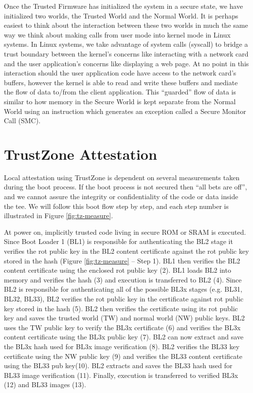 Once the Trusted Firmware has initialized the system in a secure state, we have initialized two worlds, the Trusted World and the Normal World. It is perhaps easiest to think about the interaction between these two worlds in much the same way we think about making calls from user mode into kernel mode in Linux systems. In Linux systems, we take advantage of system calls (syscall) to bridge a trust boundary between the kernel's concerns like interacting with a network card and the user application's concerns like displaying a web page. At no point in this interaction should the user application code have access to the network card's buffers, however the kernel is able to read and write these buffers and mediate the flow of data to/from the client application. This ``guarded'' flow of data is similar to how memory in the Secure World is kept separate from the Normal World using an instruction which generates an exception called a Secure Monitor Call (SMC).

\section{TrustZone Attestation}

Local \gls{attestation} using TrustZone is dependent on several \glspl{measurement} taken during the boot process. If the boot process is not secured then ``all bets are off'', and we cannot assure the integrity or confidentiality of the code or data inside the \gls{tee}. We will follow this boot flow step by step, and each step number is illustrated in Figure \ref{fig:tz-measure}.

At power on, implicitly trusted code living in secure ROM or SRAM is executed. Since Boot Loader 1 (BL1) is responsible for authenticating the BL2 stage it verifies the \gls{rot} public key in the BL2 content certificate against the \gls{rot} public key stored in the hash (Figure \ref{fig:tz-measure} -- Step 1). BL1 then verifies the BL2 content certificate using the enclosed \gls{rot} public key (2). BL1 loads BL2 into memory and verifies the hash (3) and execution is transferred to BL2 (4). Since BL2 is responsible for authenticating all of the possible BL3x stages (e.g. BL31, BL32, BL33), BL2 verifies the \gls{rot} public key in the certificate against \gls{rot} public key stored in the hash (5). BL2 then verifies the certificate using its \gls{rot} public key and saves the trusted world (TW) and normal world (NW) public keys. BL2 uses the TW public key to verify the BL3x certificate (6) and verifies the BL3x content certificate using the BL3x public key (7). BL2 can now extract and save the BL3x hash used for BL3x image verification (8). BL2 verifies the BL33 key certificate using the NW public key (9) and verifies the BL33 content certificate using the BL33 pub key(10). BL2 extracts and saves the BL33 hash used for BL33 image verification (11). Finally, execution is transferred to verified BL3x (12) and BL33 images (13).

